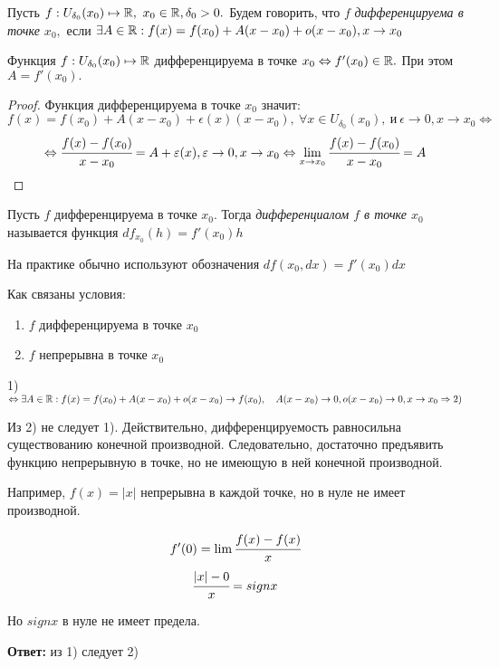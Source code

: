 \begin{definition}
    Пусть $f: U_{\delta_{0}}(x_{0}) \mapsto \R, \ x_{0} \in \R, \delta_{0} > 0.$ Будем говорить, что $f$ \textit{дифференцируема в точке $x_{0},$} если $\exists A \in \R: f(x) = f(x_{0}) + A(x-x_{0}) + o(x-x_{0}), x\to x_{0}$
\end{definition}

\begin{theorem}
    Функция $f: U_{\delta_{0}}(x_{0}) \mapsto \R$ дифференцируема в точке $x_{0} \Leftrightarrow f'(x_{0}) \in \R.$ При этом $A = f'(x_{0}).$
\end{theorem}
\begin{proof}
    Функция дифференцируема в точке $x_{0}$ значит:
    $$  f(x) = f(x_{0}) + A(x-x_{0}) + \epsilon(x)(x-x_{0}), \ \forall x \in U_{\delta_{0}}(x_{0}), \ \textrm{и} \ \epsilon \to 0, x \to x_{0} \Leftrightarrow$$
    $$
    \Leftrightarrow \cfrac{f(x)- f(x_{0})}{x - x_{0}} = A  + \epsilon(x), \epsilon \to 0, x \to x_{0} \Leftrightarrow  \lim\limits_{x \to x_{0}} \cfrac{f(x)- f(x_{0})}{x - x_{0}} = A$$
\end{proof}

\begin{definition}
    Пусть $f$ дифференцируема в точке $x_{0}$. Тогда \textit{дифференциалом $f$ в точке $x_{0}$} называется функция $df_{x_{0}}(h) = f'(x_{0})h$

    На практике обычно используют обозначения $df(x_{0}, dx) = f'(x_{0})dx$
\end{definition}

\begin{problem}
    Как связаны условия:
    \begin{enumerate}
        \item $f$ дифференцируема в точке $x_{0}$
        \item $f$ непрерывна в точке $x_{0}$
    \end{enumerate}
\end{problem}
\begin{solution}
    1) $\Leftrightarrow \exists A \in \R: f(x) = f(x_{0}) + A(x-x_{0}) + o(x-x_{0}) \to f(x_{0}), \quad  A(x-x_{0}) \to 0, o(x-x_{0}) \to 0, x\to x_{0} \Rightarrow 2)$

    Из 2) не следует 1). Действительно, дифференцируемость равносильна существованию конечной производной. Следовательно, достаточно предъявить функцию непрерывную в точке, но не имеющую в ней конечной производной. 
    
    Например, $f(x) = |x|$ непрерывна в каждой точке, но в нуле не имеет производной.

    $$f'(0) = \lim\limits \cfrac{f(x) - f(x)}{x}$$
    $$
    \cfrac{|x| - 0}{x} = sign x$$

    Но $sign x$ в нуле не имеет предела.
    
     \textbf{Ответ:} из 1) следует 2)
\end{solution}